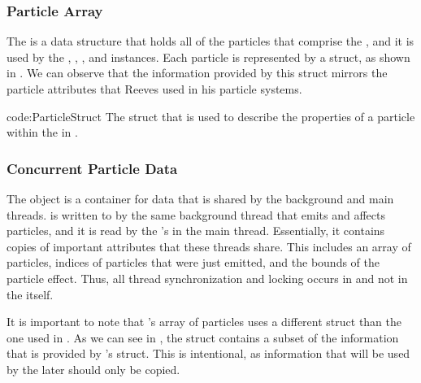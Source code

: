 \subsubsection{Particle Array}

The  is a data structure that holds all of the particles that comprise the , and it is used by the , , , and  instances. Each particle is represented by a  struct, as shown in . We can observe that the information provided by this struct mirrors the particle attributes that Reeves used in his particle systems.

{code:ParticleStruct}
{The struct that is used to describe the properties of a particle within the  in .}

\subsubsection{Concurrent Particle Data}

The  object is a container for data that is shared by the background and main threads.  is written to by the same background thread that emits and affects particles, and it is read by the 's  in the main thread. Essentially, it contains copies of important attributes that these threads share. This includes an array of particles, indices of particles that were just emitted, and the bounds of the particle effect. Thus, all thread synchronization and locking occurs in  and not in the  itself. 

It is important to note that 's array of particles uses a different struct than the one used in . As we can see in , the struct contains a subset of the information that is provided by 's  struct. This is intentional, as information that will be used by the  later should only be copied.

